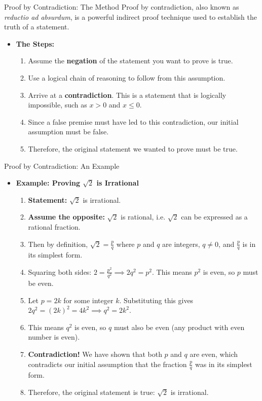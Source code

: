 \documentclass[11pt,aspectratio=1610]{beamer}
\begin{document}
\begin{frame}{Proof by Contradiction: The Method}
	Proof by contradiction, also known as \textit{reductio ad absurdum}, is a powerful indirect proof technique used to establish the truth of a statement.\vspace{3mm}
	\begin{itemize}
		\item \textbf{The Steps:}
		\begin{enumerate}\itemsep3mm
			\item Assume the \textbf{negation} of the statement you want to prove is true.
			\item Use a logical chain of reasoning to follow from this assumption.
			\item Arrive at a \textbf{contradiction}. This is a statement that is logically impossible, such as $x > 0$ and $x \leq 0$.
			\item Since a false premise must have led to this contradiction, our initial assumption must be false.
			\item Therefore, the original statement we wanted to prove must be true.
		\end{enumerate}
	\end{itemize}
\end{frame}

\begin{frame}{Proof by Contradiction: An Example}
	\begin{itemize}\itemsep3mm
		\item \textbf{Example: Proving $\sqrt{2}$ is Irrational}
		\vspace{3mm}
		\begin{enumerate}\itemsep3mm
			\item \textbf{Statement:} $\sqrt{2}$ is irrational.\p
			\item \textbf{Assume the opposite:} $\sqrt{2}$ is rational, \p i.e. $\sqrt{2}$ can be expressed as a rational fraction. \p 
			\item Then by definition, $\sqrt{2} = \frac{p}{q}$ where $p$ and $q$ are integers, $q \neq 0$, and $\frac{p}{q}$ is in its simplest form.\p
			\item Squaring both sides: $2 = \frac{p^2}{q^2} \implies 2q^2 = p^2$. This means $p^2$ is even, so $p$ must be even. \p
			\item Let $p = 2k$ for some integer $k$. Substituting this gives $2q^2 = (2k)^2 = 4k^2 \implies q^2 = 2k^2$. \p
			\item This means $q^2$ is even, so $q$ must also be even (any product with even number is even). \p
			\item \textbf{Contradiction!} We have shown that both $p$ and $q$ are even, which contradicts our initial assumption that the fraction $\frac{p}{q}$ was in its simplest form. \p
			\item Therefore, the original statement is true: $\sqrt{2}$ is irrational. 
		\end{enumerate}
	\end{itemize}
\end{frame}
\end{document}
